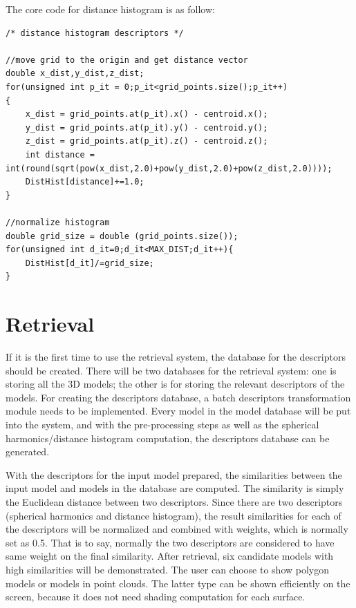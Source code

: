 The core code for distance histogram is as follow: 

\begin{lstlisting}[xleftmargin=1em]
/* distance histogram descriptors */

//move grid to the origin and get distance vector
double x_dist,y_dist,z_dist;
for(unsigned int p_it = 0;p_it<grid_points.size();p_it++)
{
	x_dist = grid_points.at(p_it).x() - centroid.x();
	y_dist = grid_points.at(p_it).y() - centroid.y();
	z_dist = grid_points.at(p_it).z() - centroid.z();
	int distance = int(round(sqrt(pow(x_dist,2.0)+pow(y_dist,2.0)+pow(z_dist,2.0))));
	DistHist[distance]+=1.0;
}

//normalize histogram
double grid_size = double (grid_points.size());
for(unsigned int d_it=0;d_it<MAX_DIST;d_it++){
	DistHist[d_it]/=grid_size;
}
\end{lstlisting}

\section{Retrieval}

If it is the first time to use the retrieval system, the database for the descriptors should be created. There will be two databases for the retrieval system: one is storing all the 3D models; the other is for storing the relevant descriptors of the models. For creating the descriptors database, a batch descriptors transformation module needs to be implemented. Every model in the model database will be put into the system, and with the pre-processing steps as well as the spherical harmonics/distance histogram computation, the descriptors database can be generated.

With the descriptors for the input model prepared, the similarities between the input model and models in the database are computed. The similarity is simply the Euclidean distance between two descriptors. Since there are two descriptors (spherical harmonics and distance histogram), the result similarities for each of the descriptors will be normalized and combined with weights, which is normally set as 0.5. That is to say, normally the two descriptors are considered to have same weight on the final similarity. After retrieval, six candidate models with high similarities will be demonstrated.  The user can choose to show polygon models or models in point clouds. The latter type can be shown efficiently on the screen, because it does not need shading computation for each surface.  



